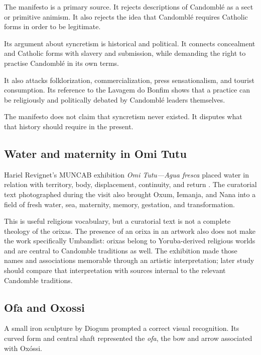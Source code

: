 The manifesto is a primary source.  It
rejects descriptions of Candombl\'e as a
sect or primitive animism.  It also rejects
the idea that Candombl\'e requires Catholic
forms in order to be legitimate.

Its argument about syncretism is historical
and political.  It connects concealment
and Catholic forms with slavery and
submission, while demanding the right to
practise Candombl\'e in its own terms.

It also attacks folklorization,
commercialization, press sensationalism,
and tourist consumption.  Its reference to
the Lavagem do Bonfim shows that a practice
can be religiously and politically debated
by Candombl\'e leaders themselves.

The manifesto does not claim that
syncretism never existed.  It disputes what
that history should require in the present.


\subsection{Water and maternity in Omi Tutu}
\label{religion-section-omi-tutu-religion}

Hariel Revignet's MUNCAB exhibition
\emph{Omi Tutu---Agua fresca} placed
water in relation with territory, body,
displacement, continuity, and return
\cite{muncab2026omitutu}.  The curatorial
text photographed during the visit also
brought Oxum, Iemanja, and Nana into a
field of fresh water, sea, maternity,
memory, gestation, and transformation.

This is useful religious vocabulary, but
a curatorial text is not a complete
theology of the orixas.  The presence of an orixa in an artwork also does not
make the work specifically Umbandist: orixas belong to Yoruba-derived
religious worlds and are central to Candomble traditions as well.  The exhibition
made those names and associations
memorable through an artistic
interpretation; later study should compare
that interpretation with sources internal
to the relevant Candomble traditions.

\subsection{Ofa and Oxossi}
\label{religion-section-ofa-oxossi}

A small iron sculpture by Diogum prompted a
correct visual recognition.  Its curved
form and central shaft represented the
\emph{ofa}, the bow and arrow associated
with Ox\'ossi.

